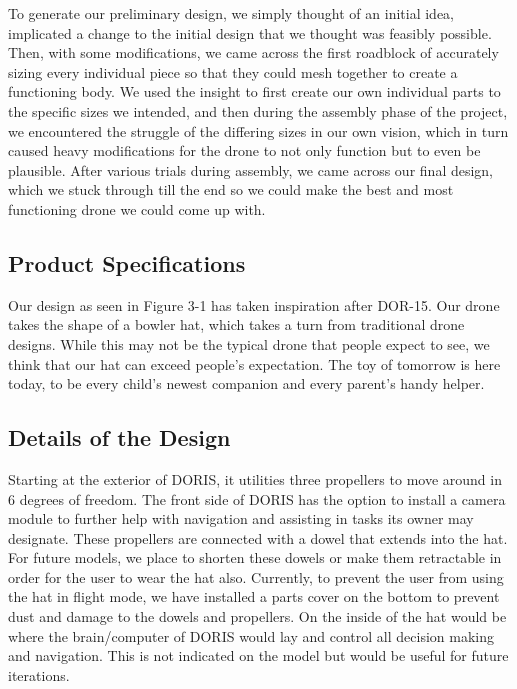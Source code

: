 

To generate our preliminary design, we simply thought of an initial idea, implicated a change to the initial design that we thought was feasibly possible. Then, with some modifications, we came across the first roadblock of accurately sizing every individual piece so that they could mesh together to create a functioning body. We used the insight to first create our own individual parts to the specific sizes we intended, and then during the assembly phase of the project, we encountered the struggle of the differing sizes in our own vision, which in turn caused heavy modifications for the drone to not only function but to even be plausible. After various trials during assembly, we came across our final design, which we stuck through till the end so we could make the best and most functioning drone we could come up with. 

\subsection{Product Specifications}

Our design as seen in Figure 3-1 has taken inspiration after DOR-15. Our drone takes the shape of a bowler hat, which takes a turn from traditional drone designs. While this may not be the typical drone that people expect to see, we think that our hat can exceed people's expectation. The toy of tomorrow is here today, to be every child's newest companion and every parent's handy helper.

\subsection{Details of the Design}

Starting at the exterior of DORIS, it utilities three propellers to move around in 6 degrees of freedom. The front side of DORIS has the option to install a camera module to further help with navigation and assisting in tasks its owner may designate. These propellers are connected with a dowel that extends into the hat. For future models, we place to shorten these dowels or make them retractable in order for the user to wear the hat also. Currently, to prevent the user from using the hat in flight mode, we have installed a parts cover on the bottom to prevent dust and damage to the dowels and propellers. On the inside of the hat would be where the brain/computer of DORIS would lay and control all decision making and navigation. This is not indicated on the model but would be useful for future iterations.

